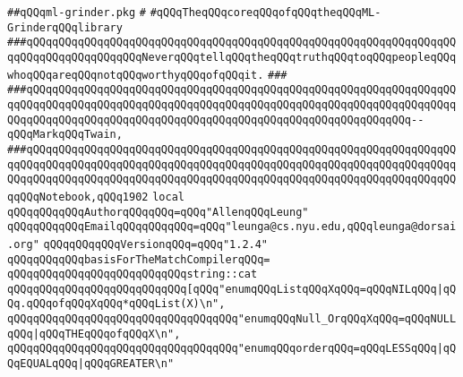 \label{src/lib/c-glue/ml-grinder/ml-grinder.pkg}
\verb|##qQQqml-grinder.pkg|\newline
\verb|#|\newline
\verb|#qQQqTheqQQqcoreqQQqofqQQqtheqQQqML-GrinderqQQqlibrary|\newline
\newline
\newline
\newline
\verb|###qQQqqQQqqQQqqQQqqQQqqQQqqQQqqQQqqQQqqQQqqQQqqQQqqQQqqQQqqQQqqQQqqQQqqQQqqQQqqQQqqQQqqQQqNeverqQQqtellqQQqtheqQQqtruthqQQqtoqQQqpeopleqQQqwhoqQQqareqQQqnotqQQqworthyqQQqofqQQqit.|\newline
\verb|###|\newline
\verb|###qQQqqQQqqQQqqQQqqQQqqQQqqQQqqQQqqQQqqQQqqQQqqQQqqQQqqQQqqQQqqQQqqQQqqQQqqQQqqQQqqQQqqQQqqQQqqQQqqQQqqQQqqQQqqQQqqQQqqQQqqQQqqQQqqQQqqQQqqQQqqQQqqQQqqQQqqQQqqQQqqQQqqQQqqQQqqQQqqQQqqQQqqQQqqQQqqQQqqQQq--qQQqMarkqQQqTwain,|\newline
\verb|###qQQqqQQqqQQqqQQqqQQqqQQqqQQqqQQqqQQqqQQqqQQqqQQqqQQqqQQqqQQqqQQqqQQqqQQqqQQqqQQqqQQqqQQqqQQqqQQqqQQqqQQqqQQqqQQqqQQqqQQqqQQqqQQqqQQqqQQqqQQqqQQqqQQqqQQqqQQqqQQqqQQqqQQqqQQqqQQqqQQqqQQqqQQqqQQqqQQqqQQqqQQqqQQqqQQqNotebook,qQQq1902|\newline
\newline
\newline
\newline
\verb|local|\newline
\newline
\verb|qQQqqQQqqQQqAuthorqQQqqQQq=qQQq"AllenqQQqLeung"|\newline
\verb|qQQqqQQqqQQqEmailqQQqqQQqqQQq=qQQq"leunga@cs.nyu.edu,qQQqleunga@dorsai.org"|\newline
\verb|qQQqqQQqqQQqVersionqQQq=qQQq"1.2.4"|\newline
\newline
\verb|qQQqqQQqqQQqbasisForTheMatchCompilerqQQq=|\newline
\verb|qQQqqQQqqQQqqQQqqQQqqQQqqQQqstring::cat|\newline
\verb|qQQqqQQqqQQqqQQqqQQqqQQqqQQq[qQQq"enumqQQqListqQQqXqQQq=qQQqNILqQQq|\verb#|qQQq.qQQqofqQQqXqQQq*qQQqList(X)\n",#\newline
\verb|qQQqqQQqqQQqqQQqqQQqqQQqqQQqqQQqqQQq"enumqQQqNull_OrqQQqXqQQq=qQQqNULLqQQq|\verb#|qQQqTHEqQQqofqQQqX\n",#\newline
\verb|qQQqqQQqqQQqqQQqqQQqqQQqqQQqqQQqqQQq"enumqQQqorderqQQq=qQQqLESSqQQq|\verb#|qQQqEQUALqQQq|qQQqGREATER\n"#\newline
